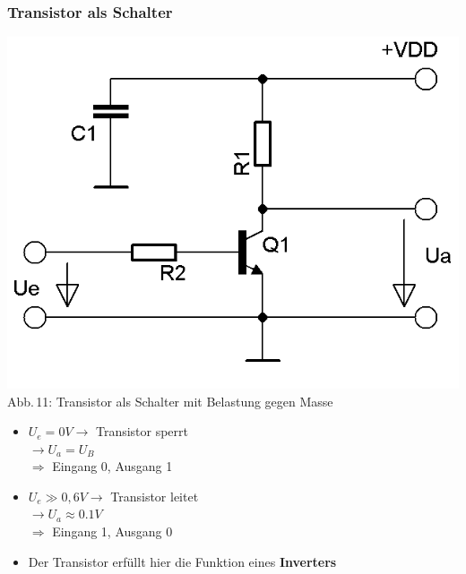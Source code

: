 \begin{frame}
  \frametitle{Transistor als Schalter}
  \begin{minipage}{0.4\textwidth}
    \begin{center}
      \includegraphics[width=\textwidth,height=.85\textheight,keepaspectratio]{a06/Transistor-Schalter.png}\\
      {\tiny Abb.\,11: Transistor als Schalter mit Belastung gegen Masse~\cite{bnetza}}
    \end{center}
  \end{minipage}
  \hspace{3mm}
  \begin{minipage}{0.5\textwidth}
    \begin{itemize}
      \item $U_e = 0 V \rightarrow$ Transistor sperrt\\ $\rightarrow U_a = U_B$\\ $\Rightarrow$ Eingang 0, Ausgang 1
      \item $U_e \gg 0,6 V \rightarrow$ Transistor leitet\\ $\rightarrow U_a \approx 0.1 V$\\ $\Rightarrow$ Eingang 1, Ausgang 0
      \item Der Transistor erfüllt hier die Funktion eines \textbf{Inverters}
    \end{itemize}
  \end{minipage}
\end{frame}

